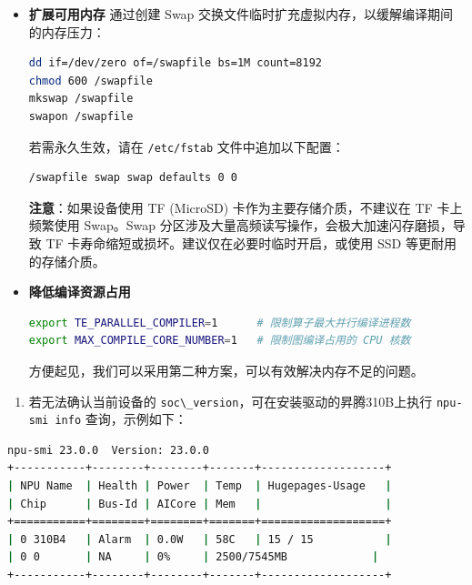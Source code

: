 \begin{itemize}
\item
  \textbf{扩展可用内存} 通过创建 Swap
  交换文件临时扩充虚拟内存，以缓解编译期间的内存压力：

\begin{lstlisting}[language=bash]
dd if=/dev/zero of=/swapfile bs=1M count=8192
chmod 600 /swapfile
mkswap /swapfile
swapon /swapfile
\end{lstlisting}

  若需永久生效，请在 \passthrough{\lstinline!/etc/fstab!}
  文件中追加以下配置：

\begin{lstlisting}
/swapfile swap swap defaults 0 0
\end{lstlisting}

  \textbf{注意}：如果设备使用 TF (MicroSD) 卡作为主要存储介质，不建议在
  TF 卡上频繁使用 Swap。Swap
  分区涉及大量高频读写操作，会极大加速闪存磨损，导致 TF
  卡寿命缩短或损坏。建议仅在必要时临时开启，或使用 SSD
  等更耐用的存储介质。
\item
  \textbf{降低编译资源占用}

\begin{lstlisting}[language=bash]
export TE_PARALLEL_COMPILER=1      # 限制算子最大并行编译进程数
export MAX_COMPILE_CORE_NUMBER=1   # 限制图编译占用的 CPU 核数
\end{lstlisting}

  方便起见，我们可以采用第二种方案，可以有效解决内存不足的问题。
\end{itemize}

\begin{enumerate}
\def\labelenumi{\arabic{enumi}.}
\setcounter{enumi}{1}
\tightlist
\item
  若无法确认当前设备的
  \passthrough{\lstinline!soc\_version!}，可在安装驱动的昇腾310B上执行
  \passthrough{\lstinline!npu-smi info!} 查询，示例如下：
\end{enumerate}

\begin{lstlisting}[language=bash]
npu-smi 23.0.0  Version: 23.0.0
+-----------+--------+--------+-------+-------------------+
| NPU Name  | Health | Power  | Temp  | Hugepages-Usage   |
| Chip      | Bus-Id | AICore | Mem   |                   |
+===========+========+========+=======+===================+
| 0 310B4   | Alarm  | 0.0W   | 58C   | 15 / 15           |
| 0 0       | NA     | 0%     | 2500/7545MB             |
+-----------+--------+--------+-------+-------------------+
\end{lstlisting}

